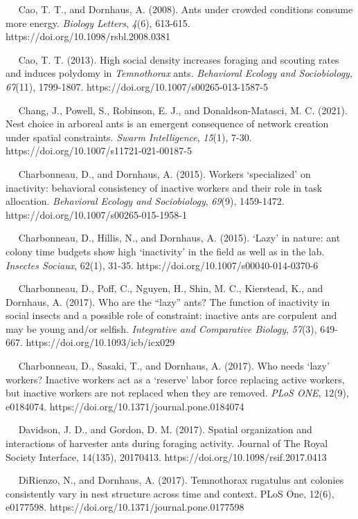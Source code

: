 \documentclass[3p]{elsarticle} %
\begin{document}
~~ Cao, T. T., and Dornhaus, A. (2008). Ants under crowded conditions
consume more energy. \emph{Biology Letters}, \emph{4}(6), 613-615.
https://doi.org/10.1098/rsbl.2008.0381

~~ Cao, T. T. (2013). High social density increases foraging and
scouting rates and induces polydomy in \emph{Temnothorax} ants.
\emph{Behavioral Ecology and Sociobiology}, \emph{67}(11), 1799-1807.
https://doi.org/10.1007/s00265-013-1587-5

~~ Chang, J., Powell, S., Robinson, E. J., and Donaldson-Matasci, M. C.
(2021). Nest choice in arboreal ants is an emergent consequence of
network creation under spatial constraints. \emph{Swarm Intelligence},
\emph{15}(1), 7-30. https://doi.org/10.1007/s11721-021-00187-5

~~ Charbonneau, D., and Dornhaus, A. (2015). Workers `specialized' on
inactivity: behavioral consistency of inactive workers and their role in
task allocation. \emph{Behavioral Ecology and Sociobiology},
\emph{69}(9), 1459-1472. https://doi.org/10.1007/s00265-015-1958-1

~~ Charbonneau, D., Hillis, N., and Dornhaus, A. (2015). `Lazy' in
nature: ant colony time budgets show high `inactivity' in the field as
well as in the lab. \emph{Insectes Sociaux}, 62(1), 31-35.
https://doi.org/10.1007/s00040-014-0370-6

~~ Charbonneau, D., Poff, C., Nguyen, H., Shin, M. C., Kierstead, K.,
and Dornhaus, A. (2017). Who are the ``lazy'' ants? The function of
inactivity in social insects and a possible role of constraint: inactive
ants are corpulent and may be young and/or selfish. \emph{Integrative
and Comparative Biology}, \emph{57}(3), 649-667.
https://doi.org/10.1093/icb/icx029

~~ Charbonneau, D., Sasaki, T., and Dornhaus, A. (2017). Who needs
`lazy' workers? Inactive workers act as a `reserve' labor force
replacing active workers, but inactive workers are not replaced when
they are removed. \emph{PLoS ONE}, 12(9), e0184074.
https://doi.org/10.1371/journal.pone.0184074

~~ Davidson, J. D., and Gordon, D. M. (2017). Spatial organization and
interactions of harvester ants during foraging activity. Journal of The
Royal Society Interface, 14(135), 20170413.
https://doi.org/10.1098/rsif.2017.0413

~~ DiRienzo, N., and Dornhaus, A. (2017). Temnothorax rugatulus ant
colonies consistently vary in nest structure across time and context.
PLoS One, 12(6), e0177598. https://doi.org/10.1371/journal.pone.0177598
\end{document}
